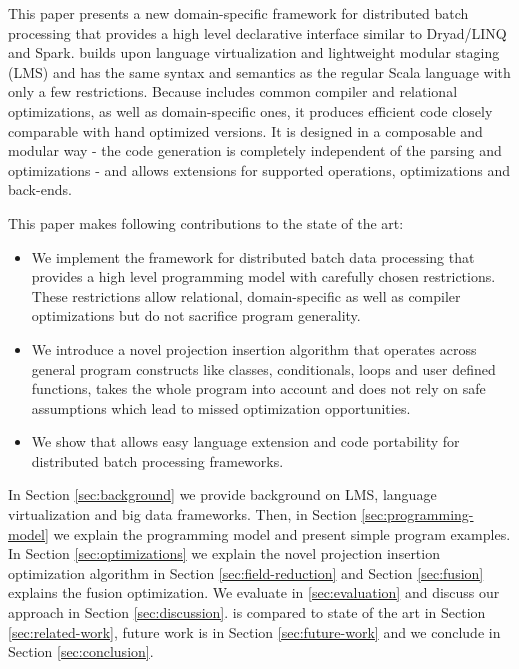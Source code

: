 This paper presents \tool a new domain-specific framework for distributed batch
processing that provides a high level declarative interface similar to
Dryad/LINQ and Spark. \tool builds upon language virtualization
\cite{moors_scala-virtualized_2012} and lightweight modular staging
\cite{rompf_lightweight_2010} (LMS) and has the same syntax and semantics as the
regular Scala language with only a few restrictions.
Because \tool includes common compiler and relational optimizations, as well as
domain-specific ones, it produces efficient code closely comparable with hand
optimized versions.
It is designed in a composable and modular way - the code generation is
completely independent of the parsing and optimizations - and allows extensions
for supported operations, optimizations and back-ends.

This paper makes following contributions to the state of the art:
\begin{itemize}

  \item We implement the \tool framework for distributed batch data
  processing that provides a high level programming model with carefully chosen
  restrictions. These restrictions allow relational, domain-specific as well as
  compiler optimizations but do not sacrifice program generality.

  \item We introduce a novel projection insertion algorithm that operates across
  general program constructs like classes, conditionals, loops and user defined
  functions, takes the whole program into account and does not rely on safe
  assumptions which lead to missed optimization opportunities.

  \item We show that \tool allows easy language extension and code portability
  for distributed batch processing frameworks.

\end{itemize} 

In Section \ref{sec:background} we provide background on LMS,
language virtualization and big data frameworks. Then, in Section
\ref{sec:programming-model} we explain the programming model and present simple
program examples. In Section \ref{sec:optimizations} we explain the novel
projection insertion optimization algorithm in Section \ref{sec:field-reduction}
and Section \ref{sec:fusion} explains the fusion optimization. We evaluate \tool
in \ref{sec:evaluation} and discuss our approach in Section
\ref{sec:discussion}. \tool is compared to state of the art in Section
\ref{sec:related-work}, future work is in Section \ref{sec:future-work} and we
conclude in Section \ref{sec:conclusion}.
